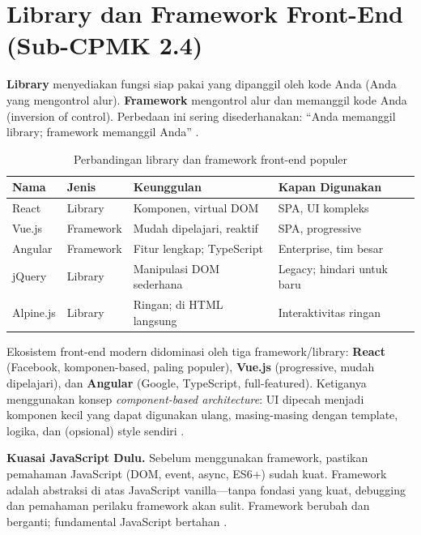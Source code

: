 ﻿\section{Library dan Framework Front-End (Sub-CPMK 2.4)}

\textbf{Library} menyediakan fungsi siap pakai yang dipanggil oleh kode Anda (Anda yang mengontrol alur). \textbf{Framework} mengontrol alur dan memanggil kode Anda (inversion of control). Perbedaan ini sering disederhanakan: ``Anda memanggil library; framework memanggil Anda'' \cite{jsInfo}.

\begin{table}[H]
\centering
\begin{tabular}{|P{2.5cm}|P{2cm}|P{3.5cm}|P{4cm}|}
\hline
\textbf{Nama} & \textbf{Jenis} & \textbf{Keunggulan} & \textbf{Kapan Digunakan} \\
\hline
React & Library & Komponen, virtual DOM & SPA, UI kompleks \\
\hline
Vue.js & Framework & Mudah dipelajari, reaktif & SPA, progressive \\
\hline
Angular & Framework & Fitur lengkap; TypeScript & Enterprise, tim besar \\
\hline
jQuery & Library & Manipulasi DOM sederhana & Legacy; hindari untuk baru \\
\hline
Alpine.js & Library & Ringan; di HTML langsung & Interaktivitas ringan \\
\hline
\end{tabular}
\caption{Perbandingan library dan framework front-end populer}
\end{table}

Ekosistem front-end modern didominasi oleh tiga framework/library: \textbf{React} (Facebook, komponen-based, paling populer), \textbf{Vue.js} (progressive, mudah dipelajari), dan \textbf{Angular} (Google, TypeScript, full-featured). Ketiganya menggunakan konsep \textit{component-based architecture}: UI dipecah menjadi komponen kecil yang dapat digunakan ulang, masing-masing dengan template, logika, dan (opsional) style sendiri \cite{mdnJsGuide}.

\begin{konsep}
\textbf{Kuasai JavaScript Dulu.} Sebelum menggunakan framework, pastikan pemahaman JavaScript (DOM, event, async, ES6+) sudah kuat. Framework adalah abstraksi di atas JavaScript vanilla---tanpa fondasi yang kuat, debugging dan pemahaman perilaku framework akan sulit. Framework berubah dan berganti; fundamental JavaScript bertahan \cite{mdnJsGuide}.
\end{konsep}

